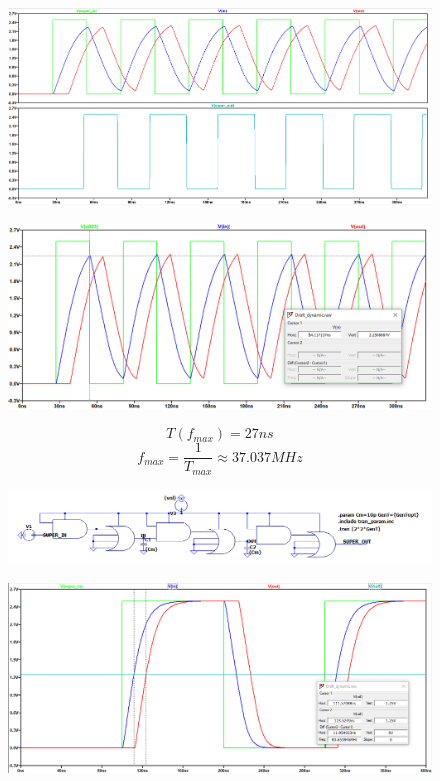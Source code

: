 \documentclass[a4paper,14pt]{article}
\begin{document}
\begin{figure}[H]
	\centering
	\includegraphics[width=\linewidth]{image/dyn_max_freq}
	\caption{}
	\label{fig:dyn_max_freq}
\end{figure}

\begin{figure}[H]
	\centering
	\includegraphics[width=\linewidth]{image/dyn_max_volt}
	\caption{}
	\label{fig:dyn_max_volt}
\end{figure}

$$T(f_{max}) = 27ns$$
$$f_{max} = \dfrac{1}{T_{max}} \approx 37.037 MHz$$

\begin{figure}[H]
	\centering
	\includegraphics[width=\linewidth]{image/dyn_shema_opt}
	\caption{}
	\label{fig:dynshemamin}
\end{figure}

\begin{figure}[H]
	\centering
	\includegraphics[width=\linewidth]{image/dyn_opt_zad01}
	\caption{}
	\label{fig:dynoptzad01}
\end{figure}
\end{document}
